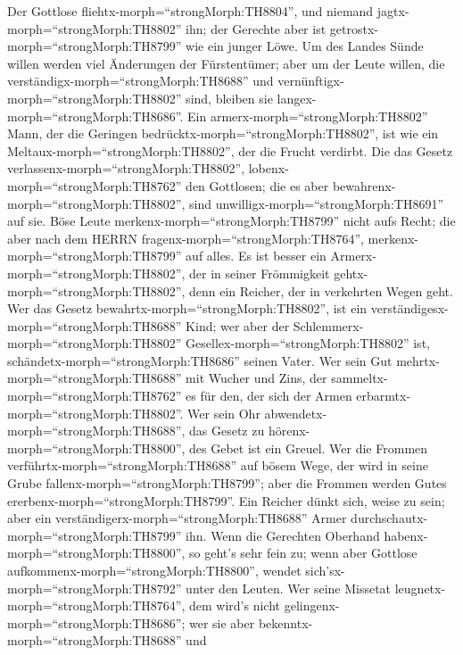  Der Gottlose fliehtx-morph=``strongMorph:TH8804'', und
niemand jagtx-morph=``strongMorph:TH8802'' ihn; der Gerechte aber ist
getrostx-morph=``strongMorph:TH8799'' wie ein junger Löwe. 
Um des Landes Sünde willen werden viel Änderungen der Fürstentümer; aber
um der Leute willen, die verständigx-morph=``strongMorph:TH8688'' und
vernünftigx-morph=``strongMorph:TH8802'' sind, bleiben sie
langex-morph=``strongMorph:TH8686''.  Ein
armerx-morph=``strongMorph:TH8802'' Mann, der die Geringen
bedrücktx-morph=``strongMorph:TH8802'', ist wie ein
Meltaux-morph=``strongMorph:TH8802'', der die Frucht verdirbt.
 Die das Gesetz verlassenx-morph=``strongMorph:TH8802'',
lobenx-morph=``strongMorph:TH8762'' den Gottlosen; die es aber
bewahrenx-morph=``strongMorph:TH8802'', sind
unwilligx-morph=``strongMorph:TH8691'' auf sie.  Böse Leute
merkenx-morph=``strongMorph:TH8799'' nicht aufs Recht; die aber nach dem
HERRN fragenx-morph=``strongMorph:TH8764'',
merkenx-morph=``strongMorph:TH8799'' auf alles.  Es ist
besser ein Armerx-morph=``strongMorph:TH8802'', der in seiner
Frömmigkeit gehtx-morph=``strongMorph:TH8802'', denn ein Reicher, der in
verkehrten Wegen geht.  Wer das Gesetz
bewahrtx-morph=``strongMorph:TH8802'', ist ein
verständigesx-morph=``strongMorph:TH8688'' Kind; wer aber der
Schlemmerx-morph=``strongMorph:TH8802''
Gesellex-morph=``strongMorph:TH8802'' ist,
schändetx-morph=``strongMorph:TH8686'' seinen Vater.  Wer
sein Gut mehrtx-morph=``strongMorph:TH8688'' mit Wucher und Zins, der
sammeltx-morph=``strongMorph:TH8762'' es für den, der sich der Armen
erbarmtx-morph=``strongMorph:TH8802''.  Wer sein Ohr
abwendetx-morph=``strongMorph:TH8688'', das Gesetz zu
hörenx-morph=``strongMorph:TH8800'', des Gebet ist ein Greuel.
 Wer die Frommen verführtx-morph=``strongMorph:TH8688'' auf
bösem Wege, der wird in seine Grube
fallenx-morph=``strongMorph:TH8799''; aber die Frommen werden Gutes
ererbenx-morph=``strongMorph:TH8799''.  Ein Reicher dünkt
sich, weise zu sein; aber ein verständigerx-morph=``strongMorph:TH8688''
Armer durchschautx-morph=``strongMorph:TH8799'' ihn.  Wenn
die Gerechten Oberhand habenx-morph=``strongMorph:TH8800'', so geht's
sehr fein zu; wenn aber Gottlose
aufkommenx-morph=``strongMorph:TH8800'', wendet
sich'sx-morph=``strongMorph:TH8792'' unter den Leuten.  Wer
seine Missetat leugnetx-morph=``strongMorph:TH8764'', dem wird's nicht
gelingenx-morph=``strongMorph:TH8686''; wer sie aber
bekenntx-morph=``strongMorph:TH8688'' und
